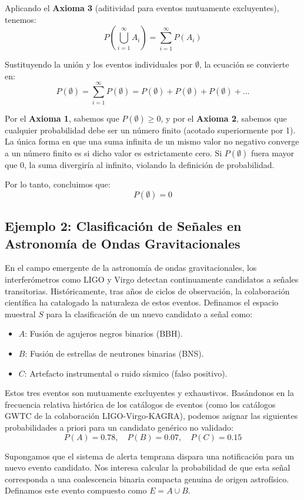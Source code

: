 Aplicando el \textbf{Axioma 3} (aditividad para eventos mutuamente excluyentes), tenemos:
$$ P\left(\bigcup_{i=1}^{\infty} A_i\right) = \sum_{i=1}^{\infty} P(A_i) $$

Sustituyendo la unión y los eventos individuales por $\emptyset$, la ecuación se convierte en:
$$ P(\emptyset) = \sum_{i=1}^{\infty} P(\emptyset) = P(\emptyset) + P(\emptyset) + P(\emptyset) + \dots $$

Por el \textbf{Axioma 1}, sabemos que $P(\emptyset) \ge 0$, y por el \textbf{Axioma 2}, sabemos que cualquier probabilidad debe ser un número finito (acotado superiormente por 1). La única forma en que una suma infinita de un mismo valor no negativo converge a un número finito es si dicho valor es estrictamente cero. Si $P(\emptyset)$ fuera mayor que 0, la suma divergiría al infinito, violando la definición de probabilidad. 

Por lo tanto, concluimos que:
$$ P(\emptyset) = 0 $$

\subsection{Ejemplo 2: Clasificación de Señales en Astronomía de Ondas Gravitacionales}

En el campo emergente de la astronomía de ondas gravitacionales, los interferómetros como LIGO y Virgo detectan continuamente candidatos a señales transitorias. Históricamente, tras años de ciclos de observación, la colaboración científica ha catalogado la naturaleza de estos eventos. Definamos el espacio muestral $S$ para la clasificación de un nuevo candidato a señal como:
\begin{itemize}
    \item $A$: Fusión de agujeros negros binarios (BBH).
    \item $B$: Fusión de estrellas de neutrones binarias (BNS).
    \item $C$: Artefacto instrumental o ruido sísmico (falso positivo).
\end{itemize}

Estos tres eventos son mutuamente excluyentes y exhaustivos. Basándonos en la frecuencia relativa histórica de los catálogos de eventos (como los catálogos GWTC de la colaboración LIGO-Virgo-KAGRA), podemos asignar las siguientes probabilidades a priori para un candidato genérico no validado:
$$ P(A) = 0.78, \quad P(B) = 0.07, \quad P(C) = 0.15 $$

Supongamos que el sistema de alerta temprana dispara una notificación para un nuevo evento candidato. Nos interesa calcular la probabilidad de que esta señal corresponda a una coalescencia binaria compacta genuina de origen astrofísico. Definamos este evento compuesto como $E = A \cup B$.

